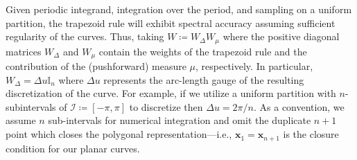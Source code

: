 \documentclass[pdflatex,iicol]{sn-jnl}%
\theoremstyle{thmstyleone}%
\theoremstyle{thmstyletwo}%
\theoremstyle{thmstylethree}%
\begin{document}
Given periodic integrand, integration over the period, and sampling on a uniform partition, the trapezoid rule will exhibit spectral accuracy assuming sufficient regularity of the curves. Thus, taking $ W \coloneqq W_{\Delta}W_\mu$ where the positive diagonal matrices $W_{\Delta}$ and $W_\mu$ contain the weights of the trapezoid rule and the contribution of the (pushforward) measure $\mu$, respectively. In particular, $W_{\Delta} = \Delta u\mathbb{I}_n$ where $\Delta u$ represents the arc-length gauge of the resulting discretization of the curve. For example, if we utilize a uniform partition with $n$-subintervals of $\mathcal{I} \coloneqq [-\pi,\pi]$ to discretize then $\Delta u = 2\pi/n$. As a convention, we assume $n$ sub-intervals for numerical integration and omit the duplicate $n+1$ point which closes the polygonal representation---i.e., $\boldsymbol{x}_1 = \boldsymbol{x}_{n+1}$ is the closure condition for our planar curves. 
\end{document}
